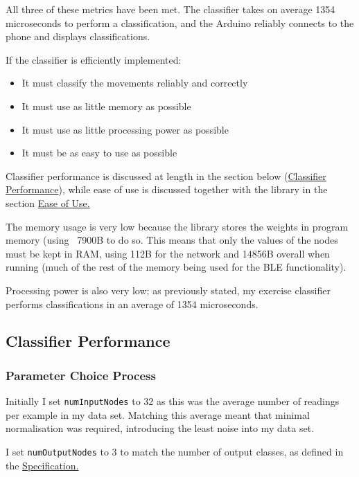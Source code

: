 \documentclass[a4paper]{article}
\begin{document}
All three of these metrics have been met. The classifier takes on average 1354 microseconds\cite{dsref0} to perform a classification, and the Arduino reliably connects to the phone and displays classifications.

If the classifier is efficiently implemented:

\begin{itemize}
\item It must classify the movements reliably and correctly
\item It must use as little memory as possible
\item It must use as little processing power as possible
\item It must be as easy to use as possible
\end{itemize}

Classifier performance is discussed at length in the section below (\hyperref[subsec:ev_cp]{Classifier Performance}), while ease of use is discussed together with the library in the section \hyperref[subsec:ev_eu]{Ease of Use.}

The memory usage is very low because the library stores the weights in program memory (using ~7900B to do so\cite{dsref2}. This means that only the values of the nodes must be kept in RAM, using 112B for the network and 14856B overall when running (much of the rest of the memory being used for the BLE functionality).

Processing power is also very low; as previously stated, my exercise classifier performs classifications in an average of 1354 microseconds\cite{dsref0}.

\newpage
\subsection{Classifier Performance}%
\label{subsec:ev_cp}

\subsubsection{Parameter Choice Process}%
\label{subsubsec:ev_cp_parameterchoiceprocess}

Initially I set \lstinline{numInputNodes} to 32 as this was the average number of readings per example in my data set. Matching this average meant that minimal normalisation was required, introducing the least noise into my data set.

I set \lstinline{numOutputNodes} to 3 to match the number of output classes, as defined in the \hyperref[subsubsec:dc_dc_classes]{Specification.}
\end{document}
